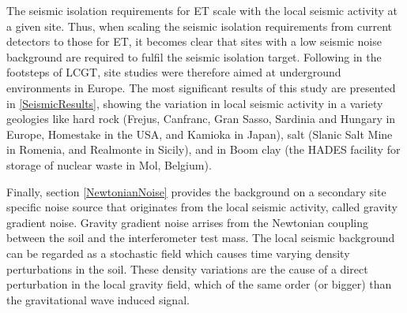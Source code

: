The seismic isolation requirements for ET scale with the local seismic activity at a given site. Thus, when scaling the seismic isolation requirements from current detectors to those for ET, it becomes clear that sites with a low seismic noise background are required to fulfil the seismic isolation target. Following in the footsteps of LCGT, site studies were therefore aimed at underground environments in Europe. The most significant results of this study are presented in \ref{SeismicResults}, showing the variation in local seismic activity in a variety geologies like hard rock (Frejus, Canfranc, Gran Sasso, Sardinia and Hungary in Europe, Homestake in the USA, and Kamioka in Japan), salt (Slanic Salt Mine in Romenia, and Realmonte in Sicily), and in Boom clay (the HADES facility for storage of nuclear waste in Mol, Belgium).  

Finally, section \ref{NewtonianNoise} provides the background on a secondary site specific noise source that originates from the local seismic activity, called gravity gradient noise. Gravity gradient noise arrises from the Newtonian coupling between the soil and the interferometer test mass. The local seismic background can be regarded as a stochastic field which causes time varying density perturbations in the soil. These density variations are the cause of a direct perturbation in the local gravity field, which of the same order (or bigger) than the gravitational wave induced signal.  

\FloatBarrier
